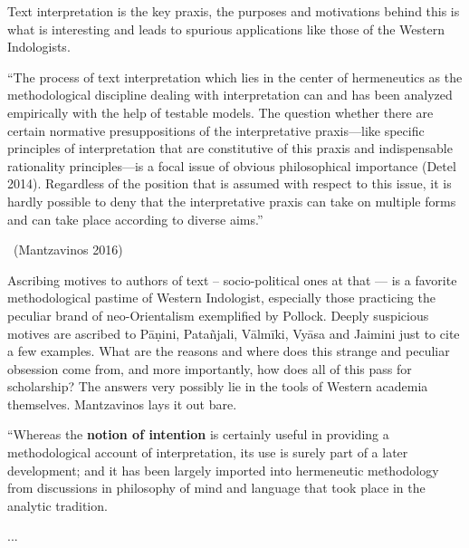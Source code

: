 Text interpretation is the key praxis, the purposes and motivations behind this is what is interesting and leads to spurious applications like those of the Western Indologists. 

\medskip

\begin{myquote}
“The process of text interpretation which lies in the center of hermeneutics as the methodological discipline dealing with interpretation can and has been analyzed empirically with the help of testable models. The question whether there are certain normative presuppositions of the interpretative praxis—like specific principles of interpretation that are constitutive of this praxis and indispensable rationality principles—is a focal issue of obvious philosophical importance (Detel 2014). Regardless of the position that is assumed with respect to this issue, it is hardly possible to deny that the interpretative praxis can take on multiple forms and can take place according to diverse aims.”

\vskip -4pt

~\hfill (Mantzavinos 2016)
\end{myquote}

Ascribing motives to authors of text – socio-political ones at that — is a favorite methodological pastime of Western Indologist, especially those practicing the peculiar brand of neo-Orientalism exemplified by Pollock. Deeply suspicious motives are ascribed to Pāṇini, Patañjali, Vālmīki, Vyāsa and Jaimini just to cite a few examples. What are the reasons and where does this strange and peculiar obsession come from, and more importantly, how does all of this pass for scholarship? The answers very possibly lie in the tools of Western academia themselves. Mantzavinos lays it out bare.

\begin{myquote}
“Whereas the \textbf{notion of intention} is certainly useful in providing a methodological account of interpretation, its use is surely part of a later development; and it has been largely imported into hermeneutic methodology from discussions in philosophy of mind and language that took place in the analytic tradition.
\end{myquote}

\begin{myquote}
...
\end{myquote}


